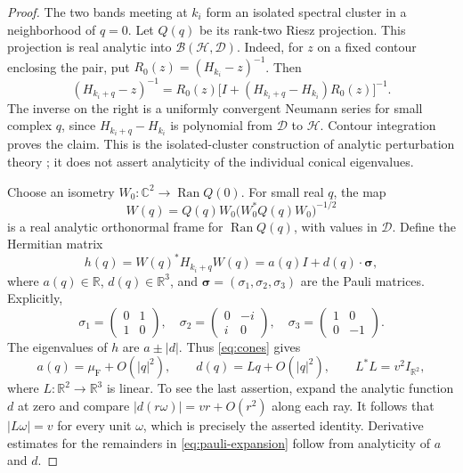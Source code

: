 \documentclass[11pt,a4paper]{article}
\newcommand{\R}{\mathbb R}
\newcommand{\C}{\mathbb C}
\newcommand{\HH}{\mathscr H}
\newcommand{\DD}{\mathscr D}
\DeclareMathOperator{\Ran}{Ran}
\numberwithin{equation}{section}
\begin{document}
\begin{proof}
The two bands meeting at $k_i$ form an isolated spectral cluster in a
neighborhood of $q=0$. Let $Q(q)$ be its rank-two Riesz projection.
This projection is real analytic into $\mathcal B(\HH,\DD)$. Indeed,
for $z$ on a fixed contour enclosing the pair, put
$R_0(z)=(H_{k_i}-z)^{-1}$. Then
\[
 (H_{k_i+q}-z)^{-1}
 =R_0(z)\bigl[I+(H_{k_i+q}-H_{k_i})R_0(z)\bigr]^{-1}.
\]
The inverse on the right is a uniformly convergent Neumann series for
small complex $q$, since $H_{k_i+q}-H_{k_i}$ is polynomial from $\DD$
to $\HH$. Contour integration proves the claim. This is the
isolated-cluster construction of analytic perturbation theory
\cite[Section XII.2]{RS4}; it does not assert analyticity of the
individual conical eigenvalues.

Choose an isometry $W_0:\C^2\to\Ran Q(0)$. For small real $q$, the map
\begin{equation}\label{eq:analytic-frame}
 W(q)=Q(q)W_0\bigl(W_0^*Q(q)W_0\bigr)^{-1/2}
\end{equation}
is a real analytic orthonormal frame for $\Ran Q(q)$, with values in
$\DD$. Define the Hermitian matrix
\begin{equation}\label{eq:pauli-h}
 h(q)=W(q)^*H_{k_i+q}W(q)
 =a(q)I+d(q)\cdot\boldsymbol\sigma,
\end{equation}
where $a(q)\in\R$, $d(q)\in\R^3$, and
$\boldsymbol\sigma=(\sigma_1,\sigma_2,\sigma_3)$ are the Pauli matrices.
Explicitly,
\[
 \sigma_1=\begin{pmatrix}0&1\\1&0\end{pmatrix},\quad
 \sigma_2=\begin{pmatrix}0&-i\\i&0\end{pmatrix},\quad
 \sigma_3=\begin{pmatrix}1&0\\0&-1\end{pmatrix}.
\]
The eigenvalues of $h$ are $a\pm|d|$. Thus \eqref{eq:cones} gives
\begin{equation}\label{eq:pauli-expansion}
 a(q)=\mu_{\mathrm F}+O(|q|^2),\qquad
 d(q)=Lq+O(|q|^2),\qquad L^*L=v^2I_{\R^2},
\end{equation}
where $L:\R^2\to\R^3$ is linear. To see the last assertion, expand the
analytic function $d$ at zero and compare
$|d(r\omega)|=vr+O(r^2)$ along each ray. It follows that
$|L\omega|=v$ for every unit $\omega$, which is precisely the asserted
identity. Derivative estimates for the remainders in
\eqref{eq:pauli-expansion} follow from analyticity of $a$ and $d$.


\end{proof}
\end{document}
